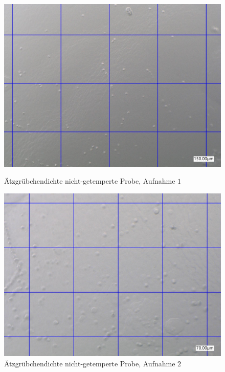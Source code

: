 \documentclass[12pt,a4paper]{scrartcl}
\numberwithin{equation}{section} %
\begin{document}
\begin{figure}[ht]
	\begin{minipage}[t]{.5\linewidth}
		\includegraphics[width=\textwidth]{../media/B2.8/Dichte1_tempered.pdf}
		\caption{Ätzgrübchendichte nicht-getemperte Probe, Aufnahme $1$}
		\label{abb:dichte_t_1}
	\end{minipage}
	\begin{minipage}[t]{.5\linewidth}
		\includegraphics[width=\textwidth]{../media/B2.8/Dichte2_tempered.pdf}
		\caption{Ätzgrübchendichte nicht-getemperte Probe, Aufnahme $2$}
		\label{abb:dichte_t_2}
	\end{minipage}
\end{figure}
\end{document}
